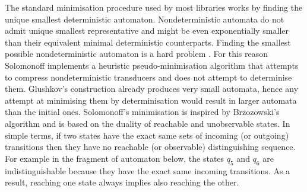 The standard minimisation procedure used by most libraries works by finding the unique smallest deterministic automaton. Nondeterministic automata do not admit unique smallest representative and might be even exponentially smaller than their equivalent minimal deterministic counterparts. Finding the smallest possible nondeterministic automaton is a hard problem \cite{KAMEDA}. For this reason Solomonoff implements a heuristic pseudo-minimisation algorithm that attempts to compress nondeterministic transducers and does not attempt to determinise them. Glushkov's construction already produces very small automata, hence any attempt at minimising them by determinisation would result in larger automata than the initial ones. Solomonoff's minimisation is inspired by Brzozowski's algorithm  \cite{brzozowski_co_algebraically} and is based on the duality of reachable and unobservable states. In simple terms, if two states have the exact same  sets of incoming (or outgoing) transitions then they have no reachable (or observable) distinguishing sequence. For example in the fragment of automaton below, the states $q_5$ and $q_6$ are indistinguishable because they have the exact same incoming transitions. As a result, reaching one state always implies also reaching the other.

